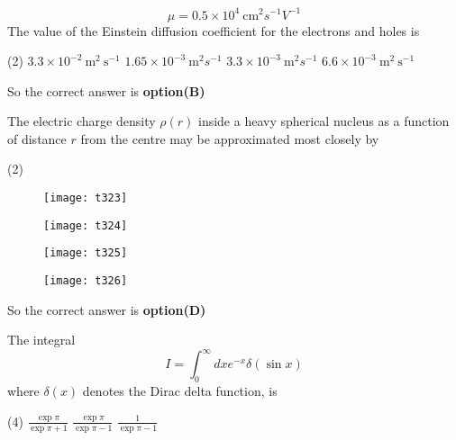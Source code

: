 \begin{questions}
\begin{minipage}{\textwidth}
	$$
	\mu=0.5 \times 10^{4} \mathrm{~cm}^{2} s^{-1} V^{-1}
	$$
	The value of the Einstein diffusion coefficient for the electrons and holes is
\end{minipage}
\begin{tasks}(2)
	\task[\textbf{A.}] $3.3 \times 10^{-2} \mathrm{~m}^{2} \mathrm{~s}^{-1}$
	\task[\textbf{B.}] $1.65 \times 10^{-3} \mathrm{~m}^{2} s^{-1}$
	\task[\textbf{C.}] $3.3 \times 10^{-3} \mathrm{~m}^{2} s^{-1}$
	\task[\textbf{D.}] $6.6 \times 10^{-3} \mathrm{~m}^{2} \mathrm{~s}^{-1}$
\end{tasks}
\begin{answer}
	So the correct answer is \textbf{option(B)}
\end{answer}
\begin{minipage}{\textwidth}
	\question The electric charge density $\rho(r)$ inside a heavy spherical nucleus as a function of distance $r$ from the centre may be approximated most closely by 
\end{minipage}
\begin{tasks}(2)
	\task[\textbf{A.}] \begin{figure}[H]
		\centering
		\texttt{[image: t323]}
	\end{figure}
	\task[\textbf{B.}] \begin{figure}[H]
		\centering
		\texttt{[image: t324]}
	\end{figure}
	\task[\textbf{C.}] \begin{figure}[H]
		\centering
		\texttt{[image: t325]}
	\end{figure}
	\task[\textbf{D.}] \begin{figure}[H]
		\centering
		\texttt{[image: t326]}
	\end{figure}
\end{tasks}
\begin{answer}
	So the correct answer is \textbf{option(D)}
\end{answer}
\begin{minipage}{\textwidth}
	\question The integral
	$$
	I=\int_{0}^{\infty} d x e^{-x} \delta(\sin x)
	$$
	where $\delta(x)$ denotes the Dirac delta function, is
\end{minipage}
\begin{tasks}(4)
	\task[\textbf{B.}] $\frac{\exp \pi}{\exp \pi+1}$
	\task[\textbf{C.}] $\frac{\exp \pi}{\exp \pi-1}$
	\task[\textbf{D.}] $\frac{1}{\exp \pi-1}$
\end{tasks}

\end{questions}
